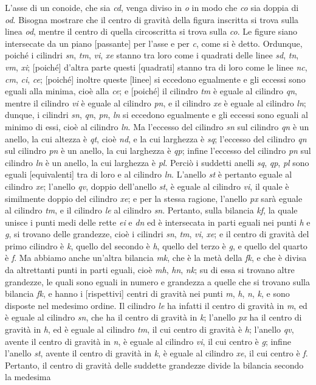 \documentclass[11pt,twoside,openany]{book}
\begin{document}
L'asse di un conoide, che sia \emph{cd}, venga diviso in \emph{o} in modo che \emph{co} sia doppia di \emph{od}. Bisogna mostrare che il centro di gravità della figura inscritta si trova sulla linea \emph{od}, mentre il centro di quella circoscritta si trova sulla \emph{co}. Le figure siano intersecate da un piano [passante] per l'asse e per \emph{c}, come si è detto. Ordunque, poiché i cilindri \emph{sn}, \emph{tm}, \emph{vi}, \emph{xe} stanno tra loro come i quadrati delle linee \emph{sd}, \emph{tn}, \emph{vm}, \emph{xi}; [poiché] d'altra parte questi [quadrati] stanno tra di loro come le linee \emph{nc}, \emph{cm}, \emph{ci}, \emph{ce}; [poiché] inoltre queste [linee] si eccedono egualmente e gli eccessi sono eguali alla minima, cioè alla \emph{ce}; e [poiché] il cilindro \emph{tm} è eguale al cilindro \emph{qn}, mentre il cilindro \emph{vi} è eguale al cilindro \emph{pn}, e il cilindro \emph{xe} è eguale al cilindro \emph{ln}; dunque, i cilindri \emph{sn}, \emph{qn}, \emph{pn}, \emph{ln} si eccedono egualmente e gli eccessi sono eguali al minimo di essi, cioè al cilindro \emph{ln}. Ma l'eccesso del cilindro \emph{sn} sul cilindro \emph{qn} è un anello, la cui altezza è \emph{qt}, cioè \emph{nd}, e la cui larghezza è \emph{sq}; l'eccesso del cilindro \emph{qn} sul cilindro \emph{pn} è un anello, la cui larghezza è \emph{qp}; infine l'eccesso del cilindro \emph{pn} sul cilindro \emph{ln} è un anello, la cui larghezza è \emph{pl}. Perciò i suddetti anelli \emph{sq}, \emph{qp}, \emph{pl} sono eguali [equivalenti] tra di loro e al cilindro \emph{ln}. L'anello \emph{st} è pertanto eguale al cilindro \emph{xe}; l'anello \emph{qv}, doppio dell'anello \emph{st}, è eguale al cilindro \emph{vi}, il quale è similmente doppio del cilindro \emph{xe}; e per la stessa ragione, l'anello \emph{px} sarà eguale al cilindro \emph{tm}, e il cilindro \emph{le} al cilindro \emph{sn}. Pertanto, sulla bilancia \emph{kf}, la quale unisce i punti medi delle rette \emph{ei} e \emph{dn} ed è intersecata in parti eguali nei punti \emph{h} e \emph{g}, si trovano delle grandezze, cioè i cilindri \emph{sn}, \emph{tm}, \emph{vi}, \emph{xe}; e il centro di gravità del primo cilindro è \emph{k}, quello del secondo è \emph{h}, quello del terzo è \emph{g}, e quello del quarto è \emph{f}. Ma abbiamo anche un'altra bilancia \emph{mk}, che è la metà della \emph{fk}, e che è divisa da altrettanti punti in parti eguali, cioè \emph{mh}, \emph{hn}, \emph{nk}; su di essa si trovano altre grandezze, le quali sono eguali in numero e grandezza a quelle che si trovano sulla bilancia \emph{fk}, e hanno i [rispettivi] centri di gravità nei punti \emph{m}, \emph{h}, \emph{n}, \emph{k}, e sono disposte nel medesimo ordine. Il cilindro \emph{le} ha infatti il centro di gravità in \emph{m}, ed è eguale al cilindro \emph{sn}, che ha il centro di gravità in \emph{k}; l'anello \emph{px} ha il centro di gravità in \emph{h}, ed è eguale al cilindro \emph{tm}, il cui centro di gravità è \emph{h}; l'anello \emph{qv}, avente il centro di gravità in \emph{n}, è eguale al cilindro \emph{vi}, il cui centro è \emph{g}; infine l'anello \emph{st}, avente il centro di gravità in \emph{k}, è eguale al cilindro \emph{xe}, il cui centro è \emph{f}. Pertanto, il centro di gravità delle suddette grandezze divide la bilancia secondo la medesima 
\end{document}
